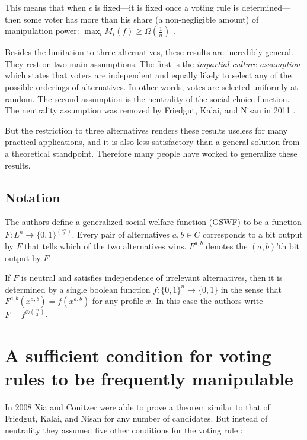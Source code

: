 	This means that when $\epsilon$ is fixed---it is fixed once a voting rule is determined---then some voter has more than his share (a non-negligible amount) of manipulation power: $\max_i M_i(f) \ge \Omega(\frac{1}{n})$ \cite{friedgut2008elections}.

	Besides the limitation to three alternatives, these results are incredibly general. They rest on two main assumptions. The first is the \emph{impartial culture assumption} which states that voters are independent and equally likely to select any of the possible orderings of alternatives. In other words, votes are selected uniformly at random. The second assumption is the neutrality of the social choice function. The neutrality assumption was removed by Friedgut, Kalai, and Nisan in 2011 \cite{friedgut2011quantitative}.

	But the restriction to three alternatives renders these results useless for many practical applications, and it is also less satisfactory than a general solution from a theoretical standpoint. Therefore many people have worked to generalize these results.


\subsection{Notation}
\label{related-friedgut-notation}

	The authors define a generalized social welfare function (GSWF) to be a function $F : L^n \rightarrow \{0, 1\}^{\binom{m}{2}}$. Every pair of alternatives $a, b \in C$ corresponds to a bit output by $F$ that tells which of the two alternatives wins. $F^{a,b}$ denotes the $(a, b)$'th bit output by $F$.

    If $F$ is neutral and satisfies independence of irrelevant alternatives, then it is determined by a single boolean function $f : \{0, 1\}^n \rightarrow \{0, 1\}$ in the sense that $F^{a,b}(x^{a,b}) = f(x^{a,b})$ for any profile $x$. In this case the authors write $F = f^{\otimes \binom{m}{2}}$.


\section{A sufficient condition for voting rules to be frequently manipulable}

	In 2008 Xia and Conitzer were able to prove a theorem similar to that of Friedgut, Kalai, and Nisan for any number of candidates. But instead of neutrality they assumed five other conditions for the voting rule \cite{xia2008sufficient}:

